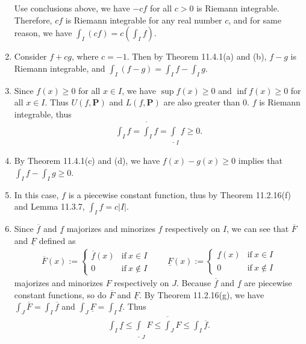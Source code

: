 \documentclass{book}
\begin{document}
\begin{enumerate}
    Use conclusions above, we have $-cf$ for all $c>0$ is Riemann integrable. Therefore, $cf$ is Riemann integrable for any real number $c$, and for same reason, we have $\int_{I}(cf)=c(\int_{I}f)$.
    \item Consider $f+cg$, where $c=-1$. Then by Theorem 11.4.1(a) and (b), $f-g$ is Riemann integrable, and $\int_{I}(f-g)=\int_{I}f-\int_{I}g$.
    \item Since $f(x)\geq 0$ for all $x\in I$, we have $\sup f(x)\geq 0$ and $\inf f(x)\geq 0$ for all $x\in I$. Thus $U(f,\mathbf{P})$ and $L(f,\mathbf{P})$ are also greater than $0$. $f$ is Riemann integrable, thus
        \begin{align*}
            \int_{I}f=\overline\int_{I}f=\underline\int_{I}f\geq 0.
        \end{align*}
    \item By Theorem 11.4.1(c) and (d), we have $f(x)-g(x)\geq 0$ implies that $\int_{I}f-\int_{I}g\geq 0$.
    \item In this case, $f$ is a piecewise constant function, thus by Theorem 11.2.16(f) and Lemma 11.3.7, $\int_{I}f=c|I|$.
    \item Since $\overline f$ and $\underline f$ majorizes and minorizes $f$ respectively on $I$, we can see that $\overline F$ and $\underline F$ defined as
        \begin{align*}
            \overline F(x):=\left\{\begin{array}{ll}
                \overline f(x)  &\text{if}\ x\in I\\
                0               &\text{if}\ x\notin I
            \end{array}\right.
            \qquad
            \underline F(x):=\left\{\begin{array}{ll}
                \underline f(x)  &\text{if}\ x\in I\\
                0               &\text{if}\ x\notin I
            \end{array}\right.
        \end{align*}
    majorizes and minorizes $F$ respectively on $J$. Because $\overline f$ and $\underline f$ are piecewise constant functions, so do $\overline F$ and $\underline F$. By Theorem 11.2.16(g), we have $\int_{J}\overline F=\int_{I}\overline f$ and $\int_{J}\underline F=\int_{I}\underline f$. Thus
        \begin{align*}
            \int_{I}\underline f
            \leq\underline\int_{J}F
            \leq\overline\int_{J}F
            \leq\int_{I}\overline f.

\end{align*}
\end{enumerate}
\end{document}

